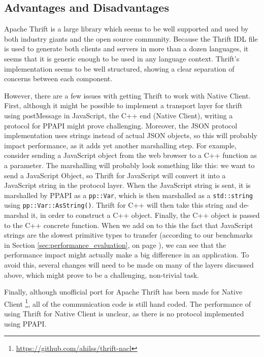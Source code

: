 \subsection{Advantages and Disadvantages} %
\label{sub:thrift_advantages_and_disadvantages}
Apache Thrift is a large library which seems to be well supported and used by both industry giants and the open source community. Because the Thrift IDL file is used to generate both clients and servers in more than a dozen languages, it seems that it is generic enough to be used in any language context. Thrift's implementation seems to be well structured, showing a clear separation of concerns between each component. 

However, there are a few issues with getting Thrift to work with Native Client. First, although it might be possible to implement a transport layer for thrift using postMessage in JavaScript, the C++ end (Native Client), writing a protocol for PPAPI might prove challenging. Moreover, the JSON protocol implementation uses strings instead of actual JSON objects, so this will probably impact performance, as it adds yet another marshalling step. For example, consider sending a JavaScript object from the web browser to a C++ function as a parameter. The marshalling will probably look something like this: we want to send a JavaScript Object, so Thrift for JavaScript will convert it into a JavaScript string in the protocol layer. When the JavaScript string is sent, it is marshalled by PPAPI as a \lstinline{pp::Var}, which is then marshalled as a \lstinline{std::string} using \lstinline{pp::Var::AsString()}. Thrift for C++ will then take this string and de-marshal it, in order to construct a C++ object. Finally, the C++ object is passed to the C++ concrete function. When we add on to this the fact that JavaScript strings are the slowest primitive types to transfer (according to our benchmarks in Section \ref{sec:performance_evaluation}, on page \pageref{sec:performance_evaluation}), we can see that the performance impact might actually make a big difference in an application. To avoid this, several changes will need to be made on many of the layers discussed above, which might prove to be a challenging, non-trivial task.

Finally, although unofficial port for Apache Thrift has been made for Native Client \footnote{\url{https://github.com/ahilss/thrift-nacl}}, all of the communication code is still hand coded. The performance of using Thrift for Native Client is unclear, as there is no protocol implemented using PPAPI.


